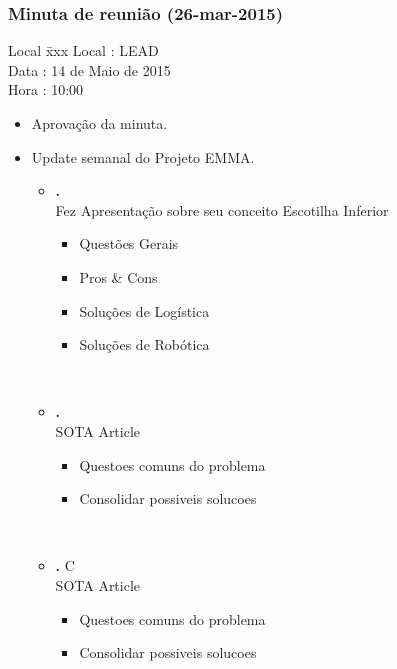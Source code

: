 \subsubsection{Minuta de reunião (26-mar-2015)}

\begin{tabbing}
  Local \= xxx \kill
  Local \> : LEAD \\
  Data  \> : 14 de Maio de 2015 \\
  Hora  \> : 10:00
\end{tabbing}


\begin{itemize}
  \item Aprovação da minuta.

  \item Update semanal do Projeto EMMA.
  \begin{itemize}

  
    \item \textbf{\renan.} 
           \\Fez Apresentação sobre seu conceito Escotilha Inferior

\begin{itemize}    
			 \item Questões Gerais
			 \item Pros & Cons
			 \item Soluções de Logística 
			 \item Soluções de Robótica
			\end {itemize}
            \\
    \item \textbf{\elael.} 
    		\\SOTA Article
    		\begin{itemize}    
			 \item Questoes comuns do problema
			 \item Consolidar possiveis solucoes 
			\end {itemize}
			\\

    \item \textbf{\gabriel.} C\\SOTA Article
    		\begin{itemize}    
			 \item Questoes comuns do problema
			 \item Consolidar possiveis solucoes 
			\end {itemize}
			\\
  \end{itemize}


\end{itemize}
